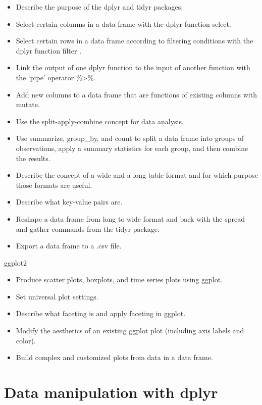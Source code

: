 \documentclass[]{book}
\providecommand{\tightlist}{%
  \setlength{\itemsep}{0pt}\setlength{\parskip}{0pt}}
\begin{document}
\begin{itemize}
\tightlist
\item
  Describe the purpose of the dplyr and tidyr packages.
\item
  Select certain columns in a data frame with the dplyr function select.
\item
  Select certain rows in a data frame according to filtering conditions
  with the dplyr function filter .
\item
  Link the output of one dplyr function to the input of another function
  with the `pipe' operator \%\textgreater{}\%.
\item
  Add new columns to a data frame that are functions of existing columns
  with mutate.
\item
  Use the split-apply-combine concept for data analysis.
\item
  Use summarize, group\_by, and count to split a data frame into groups
  of observations, apply a summary statistics for each group, and then
  combine the results.
\item
  Describe the concept of a wide and a long table format and for which
  purpose those formats are useful.
\item
  Describe what key-value pairs are.
\item
  Reshape a data frame from long to wide format and back with the spread
  and gather commands from the tidyr package.
\item
  Export a data frame to a .csv file.
\end{itemize}

ggplot2

\begin{itemize}
\tightlist
\item
  Produce scatter plots, boxplots, and time series plots using ggplot.
\item
  Set universal plot settings.
\item
  Describe what faceting is and apply faceting in ggplot.
\item
  Modify the aesthetics of an existing ggplot plot (including axis
  labels and color).
\item
  Build complex and customized plots from data in a data frame.
\end{itemize}

\hypertarget{data-manipulation-with-dplyr}{%
\section{Data manipulation with
dplyr}\label{data-manipulation-with-dplyr}}
\end{document}
